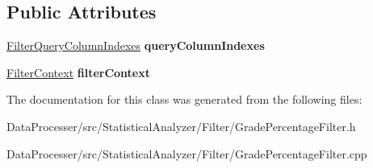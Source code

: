\subsection*{Public Attributes}
\begin{DoxyCompactItemize}
\item 
\mbox{\label{classGradePercentageFilter_a9d910bae10fff054b968853e34a83d79}} 
\hyperlink{structFilterQueryColumnIndexes}{Filter\+Query\+Column\+Indexes} {\bfseries query\+Column\+Indexes}
\item 
\mbox{\label{classGradePercentageFilter_afd8e2a3bca8b2ca675f52ed5dd9c4e37}} 
\hyperlink{structFilterContext}{Filter\+Context} {\bfseries filter\+Context}
\end{DoxyCompactItemize}


The documentation for this class was generated from the following files\+:\begin{DoxyCompactItemize}
\item 
Data\+Processer/src/\+Statistical\+Analyzer/\+Filter/Grade\+Percentage\+Filter.\+h\item 
Data\+Processer/src/\+Statistical\+Analyzer/\+Filter/Grade\+Percentage\+Filter.\+cpp\end{DoxyCompactItemize}
